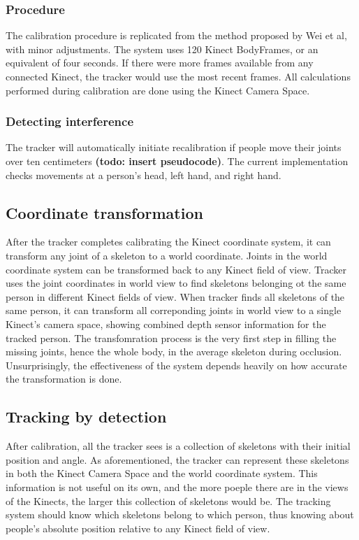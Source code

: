 \documentclass{sigchi}
\begin{document}
\subsubsection{Procedure}

The calibration procedure is replicated from the method proposed by Wei et al, with minor adjustments. The system uses 120 Kinect BodyFrames, or an equivalent of four seconds. If there were more frames available from any connected Kinect, the tracker would use the most recent frames. All calculations performed during calibration are done using the Kinect Camera Space.

\subsubsection{Detecting interference}

The tracker will automatically initiate recalibration if people move their joints over ten centimeters \textbf{(todo: insert pseudocode)}. The current implementation checks movements at a person's head, left hand, and right hand.

\subsection{Coordinate transformation}

After the tracker completes calibrating the Kinect coordinate system, it can transform any joint of a skeleton to a world coordinate. Joints in the world coordinate system can be transformed back to any Kinect field of view. Tracker uses the joint coordinates in world view to find skeletons belonging ot the same person in different Kinect fields of view. When tracker finds all skeletons of the same person, it can transform all correponding joints in world view to a single Kinect's camera space, showing combined depth sensor information for the tracked person. The transfomration process is the very first step in filling the missing joints, hence the whole body, in the average skeleton during occlusion. Unsurprisingly, the effectiveness of the system depends heavily on how accurate the transformation is done.

\subsection{Tracking by detection}

After calibration, all the tracker sees is a collection of skeletons with their initial position and angle. As aforementioned, the tracker can represent these skeletons in both the Kinect Camera Space and the world coordinate system. This information is not useful on its own, and the more poeple there are in the views of the Kinects, the larger this collection of skeletons would be. The tracking system should know which skeletons belong to which person, thus knowing about people's absolute position relative to any Kinect field of view.
\end{document}
